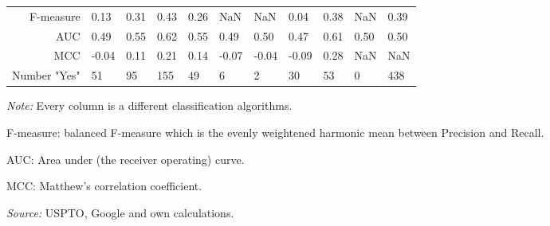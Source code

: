 \begin{table}
\begin{small}
\begin{threeparttable}
\begin{tabular}{rllllllllll}
F-measure & 0.13 & 0.31 & 0.43 & 0.26 & NaN & NaN & 0.04 & 0.38 & NaN & 0.39  \tabularnewline 
AUC & 0.49 & 0.55 & 0.62 & 0.55 & 0.49 & 0.50 & 0.47 & 0.61 & 0.50 & 0.50  \tabularnewline 
MCC & -0.04 & 0.11 & 0.21 & 0.14 & -0.07 & -0.04 & -0.09 & 0.28 & NaN & NaN  \tabularnewline 
Number "Yes" & 51 & 95 & 155 & 49 & 6 & 2 & 30 & 53 & 0 & 438  \tabularnewline 
\bottomrule 
\end{tabular} 
\begin{tablenotes}
\small
\item\textit{Note:} Every column is a different classification algorithms.
\item F-measure: balanced F-measure which is the evenly weightened harmonic mean between Precision and Recall. 
\item AUC: Area under (the receiver operating) curve.
\item MCC: Matthew's correlation coefficient.
\item\textit{Source:} USPTO, Google and own calculations.
\end{tablenotes}
\end{threeparttable}
\end{small}
\end{table}
